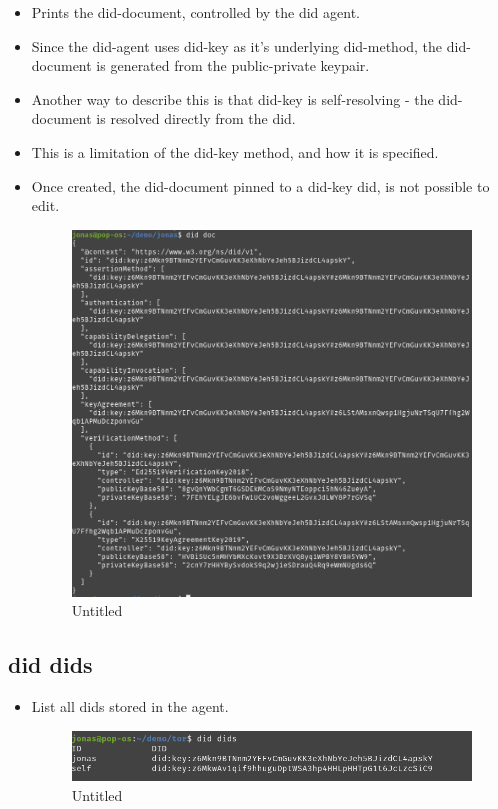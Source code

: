 \begin{itemize}
\item
  Prints the did-document, controlled by the did agent.
\item
  Since the did-agent uses did-key as it's underlying did-method, the
  did-document is generated from the public-private keypair.
\item
  Another way to describe this is that did-key is self-resolving - the
  did-document is resolved directly from the did.
\item
  This is a limitation of the did-key method, and how it is specified.
\item
  Once created, the did-document pinned to a did-key did, is not
  possible to edit.

  \begin{figure}
  \centering
  \includegraphics{User Interface f8759a9462b24d5f95cf6123d68b89ea/Untitled 2.png}
  \caption{Untitled}
  \end{figure}
\end{itemize}

\hypertarget{did-dids}{%
\subsection{did dids}\label{did-dids}}

\begin{itemize}
\item
  List all dids stored in the agent.

  \begin{figure}
  \centering
  \includegraphics{User Interface f8759a9462b24d5f95cf6123d68b89ea/Untitled 3.png}
  \caption{Untitled}
  \end{figure}
\end{itemize}

